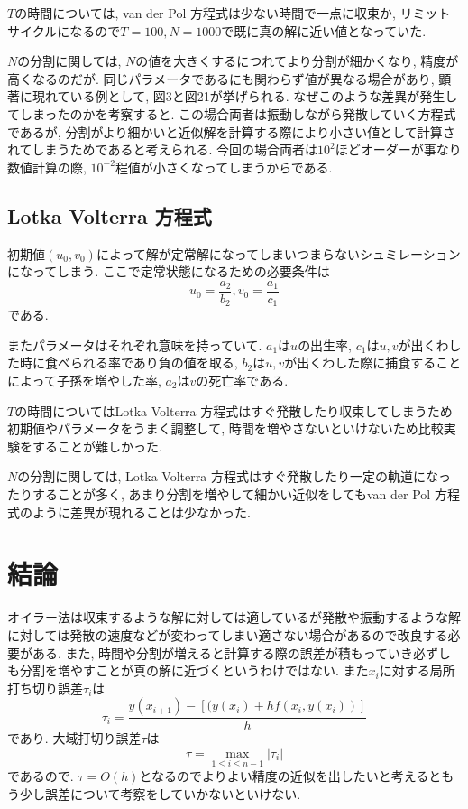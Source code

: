 \documentclass[12pt,a4paper]{jsarticle}
\begin{document}
$T$の時間については, van der Pol 方程式は少ない時間で一点に収束か, リミットサイクルになるので$T = 100, N = 1000$で既に真の解に近い値となっていた.

$N$の分割に関しては, $N$の値を大きくするにつれてより分割が細かくなり, 精度が高くなるのだが. 同じパラメータであるにも関わらず値が異なる場合があり, 顕著に現れている例として, 図3と図21が挙げられる. なぜこのような差異が発生してしまったのかを考察すると. この場合両者は振動しながら発散していく方程式であるが, 分割がより細かいと近似解を計算する際により小さい値として計算されてしまうためであると考えられる. 今回の場合両者は$10^2$ほどオーダーが事なり数値計算の際, $10^{-2}$程値が小さくなってしまうからである.

\subsection{Lotka Volterra 方程式}
初期値$(u_0, v_0)$によって解が定常解になってしまいつまらないシュミレーションになってしまう. ここで定常状態になるための必要条件は$$u_0 = \frac{a_2}{b_2}, v_0 = \frac{a_1}{c_1}$$である. 

またパラメータはそれぞれ意味を持っていて. $a_1$は$u$の出生率, $c_1$は$u, v$が出くわした時に食べられる率であり負の値を取る, $b_2$は$u, v$が出くわした際に捕食することによって子孫を増やした率, $a_2$は$v$の死亡率である.

$T$の時間についてはLotka Volterra 方程式はすぐ発散したり収束してしまうため初期値やパラメータをうまく調整して, 時間を増やさないといけないため比較実験をすることが難しかった.

$N$の分割に関しては, Lotka Volterra 方程式はすぐ発散したり一定の軌道になったりすることが多く, あまり分割を増やして細かい近似をしてもvan der Pol 方程式のように差異が現れることは少なかった.

\section{結論}
オイラー法は収束するような解に対しては適しているが発散や振動するような解に対しては発散の速度などが変わってしまい適さない場合があるので改良する必要がある.
また, 時間や分割が増えると計算する際の誤差が積もっていき必ずしも分割を増やすことが真の解に近づくというわけではない. また$x_i$に対する局所打ち切り誤差$\tau_i$は$$\tau_i = \frac{y(x_{i+1}) - [(y(x_i) + hf(x_i, y(x_i))]}{h}$$であり. 大域打切り誤差$\tau$は$$\tau = \max_{1 \le i \le n-1} |\tau_i|$$であるので. $\tau = O(h)$となるのでよりよい精度の近似を出したいと考えるともう少し誤差について考察をしていかないといけない.
\end{document}
